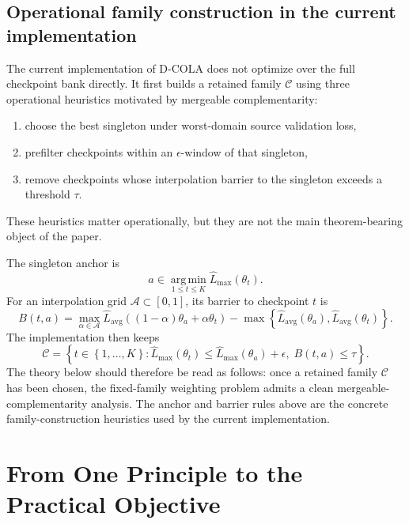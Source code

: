 \documentclass{article}
\theoremstyle{definition}
\newcommand{\cA}{\mathcal{A}}
\newcommand{\cC}{\mathcal{C}}
\newcommand{\argmin}{\operatorname*{arg\,min}}
\newcommand{\dcola}{\textup{\textsc{D-COLA}}}
\newcommand{\paren}[1]{\left( #1 \right)}
\newcommand{\braces}[1]{\left\{ #1 \right\}}
\begin{document}
\subsection{Operational family construction in the current implementation}
\label{subsec:heuristics}

The current implementation of \dcola{} does not optimize over the full checkpoint bank directly. It first builds a retained family \(\cC\) using three operational heuristics motivated by mergeable complementarity:
\begin{enumerate}[leftmargin=1.3em]
    \item choose the best singleton under worst-domain source validation loss,
    \item prefilter checkpoints within an \(\epsilon\)-window of that singleton,
    \item remove checkpoints whose interpolation barrier to the singleton exceeds a threshold \(\tau\).
\end{enumerate}
These heuristics matter operationally, but they are not the main theorem-bearing object of the paper.

The singleton anchor is
\begin{equation}
a \in \argmin_{1\le t\le K} \widehat L_{\max}(\theta_t).
\label{eq:anchor}
\end{equation}
For an interpolation grid \(\cA \subset [0,1]\), its barrier to checkpoint \(t\) is
\begin{equation}
B(t,a)
=
\max_{\alpha\in\cA}
\widehat L_{\mathrm{avg}}\paren{(1-\alpha)\theta_a + \alpha \theta_t}
-
\max\braces{\widehat L_{\mathrm{avg}}(\theta_a), \widehat L_{\mathrm{avg}}(\theta_t)}.
\label{eq:barrier}
\end{equation}
The implementation then keeps
\begin{equation}
\cC
=
\braces{
t\in\braces{1,\dots,K}:
\widehat L_{\max}(\theta_t)\le \widehat L_{\max}(\theta_a)+\epsilon,
\;
B(t,a)\le \tau
}.
\label{eq:candidates}
\end{equation}
The theory below should therefore be read as follows: once a retained family \(\cC\) has been chosen, the fixed-family weighting problem admits a clean mergeable-complementarity analysis. The anchor and barrier rules above are the concrete family-construction heuristics used by the current implementation.

\section{From One Principle to the Practical Objective}
\label{sec:principle}
\end{document}
